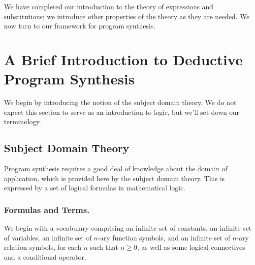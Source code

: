 \documentclass[runningheads]{llncs}
\begin{document}
 



    




  

  

   We have completed our introduction to the theory of expressions and substitutions;  we  introduce other properties of the theory as they are needed.  We now turn to our framework for program synthesis.
   
  
   
   
   
   \section{A Brief Introduction to Deductive Program Synthesis}
   
   We begin by introducing the notion of the subject domain theory. We do not expect this section to serve as an introduction to logic, but we'll set down our terminology.
   

   \subsection{Subject Domain Theory}
   
   Program synthesis requires a good deal of knowledge about the domain of application, which is provided here by the subject domain theory.  This is expressed by a set of logical formulas in mathematical logic.
   
   \subsubsection{Formulas and Terms.} We begin with a vocabulary comprising an infinite set of constants, an infinite set of variables, an infinite set of $n$-ary function symbols, and an infinite set of $n$-ary relation symbols, for each $n$ such that $n \geq 0$, as well as some logical connectives and a conditional operator.  
   
\end{document}

